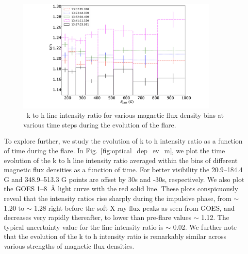 \begin{figure}[ht!]
    \centering
    \includegraphics[trim={8cm 1cm 2cm 0.2cm},clip,width=0.9\textwidth]{Figures/Flare-m-optical-depth-2.jpeg}
    \caption{~k to h line intensity ratio for various magnetic flux density bins at various time steps during the evolution of the flare.}
    \label{fig:optical_depth_m}
\end{figure}

To explore further, we study the evolution of k to h intensity ratio as a function of time during the flare. In Fig.~\ref{fig:optical_dep_ev_m}, we plot the time evolution of the k to h line intensity ratio averaged within the bins of different magnetic flux densities as a function of time. For better visibility the 20.9{--}184.4 G and 348.9{--}513.3 G points are offset by 30s and -30s, respectively. We also plot the GOES 1{--}8~{\AA} light curve with the red solid line. These plots conspicuously reveal that the intensity ratios rise sharply during the impulsive phase, from $\sim$ 1.20 to $\sim$ 1.28 right before the soft X-ray flux peaks as seen from GOES, and decreases very rapidly thereafter, to lower than pre-flare values $\sim$ 1.12. The typical uncertainty value for the line intensity ratio is $\sim$ 0.02. We further note that the evolution of the   k to h intensity ratio is remarkably similar across various strengths of magnetic flux densities.

